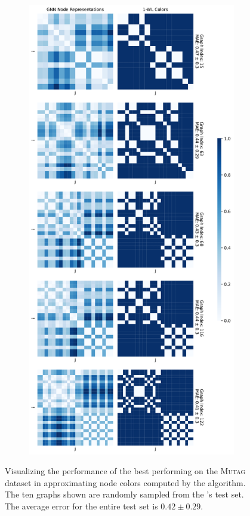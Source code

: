 \begin{figure}[H]
\begin{subfigure}[b]{0.45992852703\textwidth}
    \end{subfigure}
    \hfill
    \begin{subfigure}[b]{0.53007147296\textwidth}
        \includegraphics[width=\textwidth, right]{Figures/heatmaps_MUTAG_1.pdf}
    \end{subfigure}
    \hfill
    \caption{Visualizing the performance of the best performing \gnn on the \textsc{Mutag} dataset in approximating node colors computed by the \wl algorithm. The ten graphs shown are randomly sampled from the \gnn's test set. The average error for the entire test set is $0.42 \pm 0.29$.}
    \label{fig:gnn_approx_mutag}
\end{figure}
\clearpage

